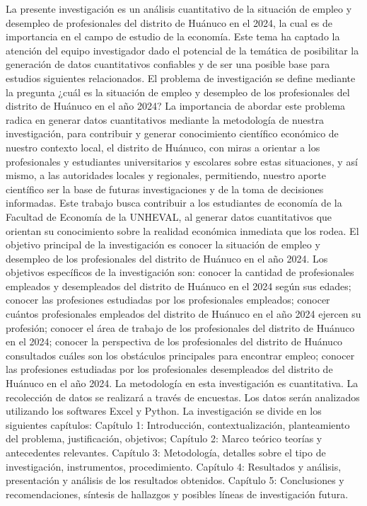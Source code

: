 \documentclass[12pt, a4paper]{article}
\begin{document}
La presente investigación es un análisis cuantitativo de la situación de empleo y desempleo de profesionales del distrito de Huánuco en el 2024, la cual es de importancia en el campo de estudio de la economía. Este tema ha captado la atención del equipo investigador dado el potencial de la temática de posibilitar  la generación de datos cuantitativos confiables y de ser una posible base para estudios siguientes relacionados. El problema de investigación se define mediante la pregunta ¿cuál es la situación de empleo y desempleo de los profesionales del distrito de Huánuco en el año 2024? La importancia de abordar este problema radica en generar datos cuantitativos mediante la metodología de nuestra investigación, para contribuir y generar conocimiento científico económico de nuestro contexto local, el distrito de Huánuco, con miras a orientar a los profesionales y estudiantes universitarios y escolares sobre estas situaciones, y así mismo, a las autoridades locales y regionales, permitiendo, nuestro aporte científico ser la base de futuras investigaciones y de la toma de decisiones informadas. Este trabajo busca contribuir a los estudiantes de economía de la Facultad de Economía de la UNHEVAL, al generar datos cuantitativos que orientan su conocimiento sobre la realidad económica inmediata que los rodea. El objetivo principal de la investigación es conocer la situación de empleo y desempleo de los profesionales del distrito de Huánuco en el año 2024. Los objetivos específicos de la investigación son: conocer la cantidad de profesionales empleados y desempleados del distrito de Huánuco en el 2024 según sus edades; conocer las profesiones estudiadas por los profesionales empleados; conocer cuántos profesionales empleados del distrito de Huánuco en el año 2024 ejercen su profesión; conocer el área de trabajo de los profesionales del distrito de Huánuco en el 2024; conocer la perspectiva de los profesionales del distrito de Huánuco consultados cuáles son los obstáculos principales para encontrar empleo; conocer las profesiones estudiadas por los profesionales desempleados del distrito de Huánuco en el año 2024. La metodología en esta investigación es cuantitativa. La recolección de datos se realizará a través de encuestas. Los datos serán analizados utilizando los softwares Excel y Python. La investigación se divide en los siguientes capítulos: Capítulo 1: Introducción, contextualización, planteamiento del problema, justificación, objetivos; Capítulo 2: Marco teórico teorías y antecedentes relevantes. Capítulo 3: Metodología, detalles sobre el tipo de investigación, instrumentos, procedimiento. Capítulo 4: Resultados y análisis, presentación y análisis de los resultados obtenidos. Capítulo 5: Conclusiones y recomendaciones, síntesis de hallazgos y posibles líneas de investigación futura.
\end{document}
